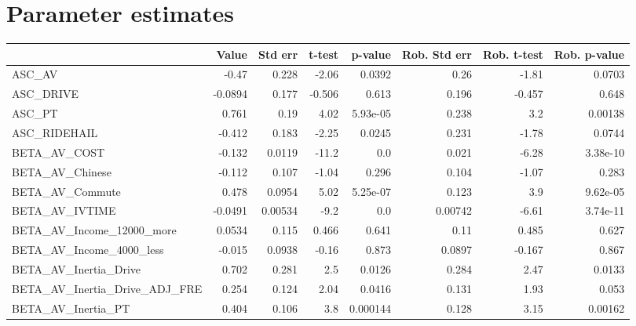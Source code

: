 \section{Parameter estimates}
\begin{tabular}{lrrrrrrr}
\toprule
{} &     Value &  Std err &    t-test &  p-value &  Rob. Std err &  Rob. t-test &  Rob. p-value \\
\midrule
ASC\_AV                           &     -0.47 &    0.228 &     -2.06 &   0.0392 &          0.26 &        -1.81 &        0.0703 \\
ASC\_DRIVE                        &   -0.0894 &    0.177 &    -0.506 &    0.613 &         0.196 &       -0.457 &         0.648 \\
ASC\_PT                           &     0.761 &     0.19 &      4.02 & 5.93e-05 &         0.238 &          3.2 &       0.00138 \\
ASC\_RIDEHAIL                     &    -0.412 &    0.183 &     -2.25 &   0.0245 &         0.231 &        -1.78 &        0.0744 \\
BETA\_AV\_COST                     &    -0.132 &   0.0119 &     -11.2 &      0.0 &         0.021 &        -6.28 &      3.38e-10 \\
BETA\_AV\_Chinese                  &    -0.112 &    0.107 &     -1.04 &    0.296 &         0.104 &        -1.07 &         0.283 \\
BETA\_AV\_Commute                  &     0.478 &   0.0954 &      5.02 & 5.25e-07 &         0.123 &          3.9 &      9.62e-05 \\
BETA\_AV\_IVTIME                   &   -0.0491 &  0.00534 &      -9.2 &      0.0 &       0.00742 &        -6.61 &      3.74e-11 \\
BETA\_AV\_Income\_12000\_more        &    0.0534 &    0.115 &     0.466 &    0.641 &          0.11 &        0.485 &         0.627 \\
BETA\_AV\_Income\_4000\_less         &    -0.015 &   0.0938 &     -0.16 &    0.873 &        0.0897 &       -0.167 &         0.867 \\
BETA\_AV\_Inertia\_Drive            &     0.702 &    0.281 &       2.5 &   0.0126 &         0.284 &         2.47 &        0.0133 \\
BETA\_AV\_Inertia\_Drive\_ADJ\_FRE    &     0.254 &    0.124 &      2.04 &   0.0416 &         0.131 &         1.93 &         0.053 \\
BETA\_AV\_Inertia\_PT               &     0.404 &    0.106 &       3.8 & 0.000144 &         0.128 &         3.15 &       0.00162 \\

\end{tabular}
